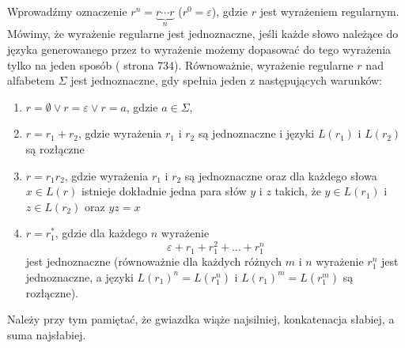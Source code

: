 Wprowadźmy oznaczenie $r^n=\underbrace{r\dotsm r}_n$ ($r^0=\varepsilon$), gdzie $r$ jest wyrażeniem regularnym. Mówimy, że wyrażenie regularne jest jednoznaczne, jeśli każde słowo należące do języka generowanego przez to wyrażenie możemy dopasować do tego wyrażenia tylko na jeden sposób (\cite{Flajolet_08} strona 734). Równoważnie, wyrażenie regularne $r$ nad alfabetem $\Sigma$ jest jednoznaczne, gdy spełnia jeden z następujących warunków:
\begin{enumerate}
    \item $r=\emptyset \vee r=\varepsilon \vee r=a$, gdzie $a\in\Sigma$,
    \item $r=r_1+r_2$, gdzie wyrażenia $r_1$ i $r_2$ są jednoznaczne i języki $L(r_1)$ i $L(r_2)$ są rozłączne
    \item $r=r_1r_2$, gdzie wyrażenia $r_1$ i $r_2$ są jednoznaczne oraz dla każdego słowa $x\in L(r)$ istnieje dokładnie jedna para słów $y$ i $z$ takich, że $y\in L(r_1)$ i $z\in L(r_2)$ oraz $yz=x$
    \item $r=r_1^*$, gdzie dla każdego $n$ wyrażenie
    $$\varepsilon+r_1+r_1^2+\ldots+r_1^n$$
    jest jednoznaczne (równoważnie dla każdych różnych $m$ i $n$ wyrażenie $r_1^n$ jest jednoznaczne, a języki $L(r_1)^n=L(r_1^n)$ i $L(r_1)^m=L(r_1^m)$ są rozłączne).
\end{enumerate}
Należy przy tym pamiętać, że gwiazdka wiąże najsilniej, konkatenacja słabiej, a suma najsłabiej.

